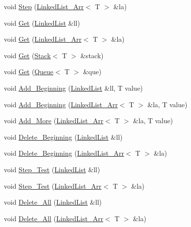\begin{DoxyCompactItemize}
\item 
void \hyperlink{class_l_ltester_a0f2fa22f42f7217700c95dfb223689dd}{Step} (\hyperlink{class_linked_list___arr}{Linked\-List\-\_\-\-Arr}$<$ T $>$ \&la)
\item 
void \hyperlink{class_l_ltester_abae4772e90c34c509de01c9d1210cdc8}{Get} (\hyperlink{class_linked_list}{Linked\-List} \&ll)
\item 
void \hyperlink{class_l_ltester_abf6915fe5a976213848e60c1f8ce4d3f}{Get} (\hyperlink{class_linked_list___arr}{Linked\-List\-\_\-\-Arr}$<$ T $>$ \&la)
\item 
void \hyperlink{class_l_ltester_a608b153b3d91bd514cda7473af9a79e4}{Get} (\hyperlink{class_stack}{Stack}$<$ T $>$ \&stack)
\item 
void \hyperlink{class_l_ltester_a653c5ffda0d3d4a21766e0fe29286ac6}{Get} (\hyperlink{class_queue}{Queue}$<$ T $>$ \&que)
\item 
void \hyperlink{class_l_ltester_af1e7da6a3dd01b624e5c29b4faa87ffd}{Add\-\_\-\-Beginning} (\hyperlink{class_linked_list}{Linked\-List} \&ll, T value)
\item 
void \hyperlink{class_l_ltester_aa7f798f129a87f11b37527991f3d0da5}{Add\-\_\-\-Beginning} (\hyperlink{class_linked_list___arr}{Linked\-List\-\_\-\-Arr}$<$ T $>$ \&la, T value)
\item 
void \hyperlink{class_l_ltester_ad3c123934e61077648920eaa34e665d2}{Add\-\_\-\-More} (\hyperlink{class_linked_list___arr}{Linked\-List\-\_\-\-Arr}$<$ T $>$ \&la, T value)
\item 
void \hyperlink{class_l_ltester_a70219340c04d3aa476897209b7d75740}{Delete\-\_\-\-Beginning} (\hyperlink{class_linked_list}{Linked\-List} \&ll)
\item 
void \hyperlink{class_l_ltester_a8ed774e316f8f218aa0f75c783e25d25}{Delete\-\_\-\-Beginning} (\hyperlink{class_linked_list___arr}{Linked\-List\-\_\-\-Arr}$<$ T $>$ \&la)
\item 
void \hyperlink{class_l_ltester_a29aa03d43d14bf3d066531dd984ea8c3}{Step\-\_\-\-Test} (\hyperlink{class_linked_list}{Linked\-List} \&ll)
\item 
void \hyperlink{class_l_ltester_ab10a3a7f3eb182e9b3feaeb7c368d9a4}{Step\-\_\-\-Test} (\hyperlink{class_linked_list___arr}{Linked\-List\-\_\-\-Arr}$<$ T $>$ \&la)
\item 
void \hyperlink{class_l_ltester_a01df83a371999cccb2d422839373c538}{Delete\-\_\-\-All} (\hyperlink{class_linked_list}{Linked\-List} \&ll)
\item 
void \hyperlink{class_l_ltester_a86b0a4f1c87b4db73e965141126aa425}{Delete\-\_\-\-All} (\hyperlink{class_linked_list___arr}{Linked\-List\-\_\-\-Arr}$<$ T $>$ \&la)

\end{DoxyCompactItemize}
